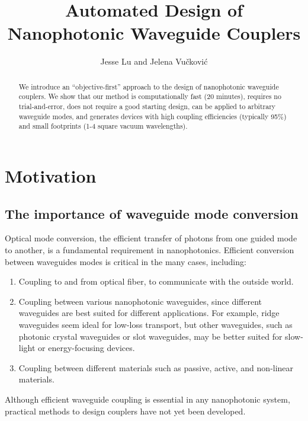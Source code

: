 \documentclass[letterpaper,10pt]{article}
\begin{document}
\title{Automated Design of Nanophotonic Waveguide Couplers}
\author{Jesse Lu and Jelena Vu\v{c}kovi\'{c}}
\address{Stanford University, Stanford, California, USA.}

\maketitle
\begin{abstract}
We introduce an ``objective-first'' approach to the design of
    nanophotonic waveguide couplers.
We show that our method is
    computationally fast (20 minutes), 
    requires no trial-and-error,
    does not require a good starting design,
    can be applied to arbitrary waveguide modes,
    and generates devices with high coupling efficiencies (typically 95\%)
    and small footprints (1-4 square vacuum wavelengths).
\end{abstract}


\section{Motivation}

\subsection{The importance of waveguide mode conversion}
Optical mode conversion, 
    the efficient transfer of photons from one guided mode to another,
    is a fundamental requirement in nanophotonics.
Efficient conversion between waveguides modes
    is critical in the many cases, including:
    \begin{enumerate}
        \item Coupling to and from optical fiber\cite{}, 
        to communicate with the outside world.
    \item Coupling between various nanophotonic waveguides, 
        since different waveguides are best suited for different applications.
        For example, ridge waveguides seem ideal for low-loss transport\cite{},
            but other waveguides, 
            such as photonic crystal waveguides or slot waveguides,
            may be better suited for slow-light\cite{} 
            or energy-focusing devices\cite{}.
    \item Coupling between different materials such as
       passive, active\cite{}, and non-linear\cite{} materials. 
    \end{enumerate}
Although efficient waveguide coupling is essential in any nanophotonic system,
    practical methods to design couplers have not yet been developed.
\end{document}
